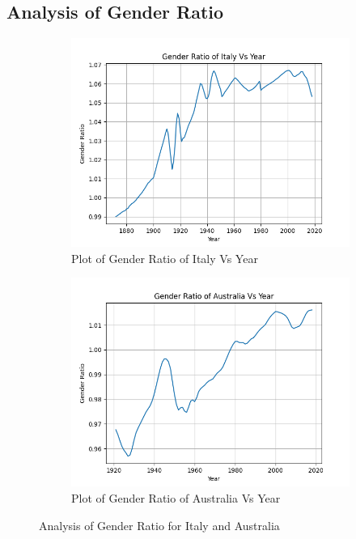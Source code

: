 \documentclass[fleqn, 11pt]{article}
\begin{document}
\subsection{Analysis of Gender Ratio}
\begin{figure}[H]
    \centering
    \begin{subfigure}[H]{0.49\textwidth}
        \centering
        \includegraphics[width=\textwidth]{P3/plot_ita.png}
        \caption[]{Plot of Gender Ratio of Italy Vs Year}
    \end{subfigure}
    \begin{subfigure}[H]{0.49\textwidth}
        \centering
        \includegraphics[width=\textwidth]{P3/plot_aus.png}
        \caption[]{Plot of Gender Ratio of Australia Vs Year}
    \end{subfigure}
    \caption{Analysis of Gender Ratio for Italy and Australia}
\end{figure}
\end{document}

